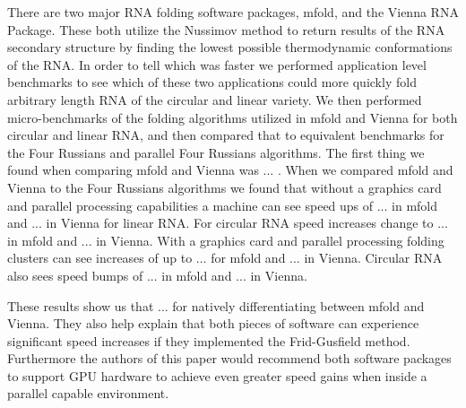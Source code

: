 \documentclass[12pt]{article}
\begin{document}
\par There are two major RNA folding software packages, mfold\cite{zuker1989,zuker1981}, and the Vienna RNA Package\cite{vienna}. These both utilize the Nussimov method to return results of the RNA secondary structure by finding the lowest possible thermodynamic conformations of the RNA\cite{zuker1981,vienna}. In order to tell which was faster we performed application level benchmarks\cite{eulogy} to see which of these two applications could more quickly fold arbitrary length RNA of the circular and linear variety. We then performed micro-benchmarks\cite{sysperformance} of the folding algorithms utilized in mfold and Vienna for both circular and linear RNA, and then compared that to equivalent benchmarks for the Four Russians and parallel Four Russians algorithms. The first thing we found when comparing mfold and Vienna was ... . When we compared mfold and Vienna to the Four Russians algorithms we found that without a graphics card and parallel processing capabilities a machine can see speed ups of ... in mfold and ... in Vienna for linear RNA. For circular RNA speed increases change to ... in mfold and ... in Vienna. With a graphics card and parallel processing folding clusters can see increases of up to ... for mfold and ... in Vienna. Circular RNA also sees speed bumps of ... in mfold and ... in Vienna.
\par These results show us that ... for natively differentiating between mfold and Vienna. They also help explain that both pieces of software can experience significant speed increases if they implemented the Frid-Gusfield method. Furthermore the authors of this paper would recommend both software packages to support GPU hardware to achieve even greater speed gains when inside a parallel capable environment.
\end{document}
